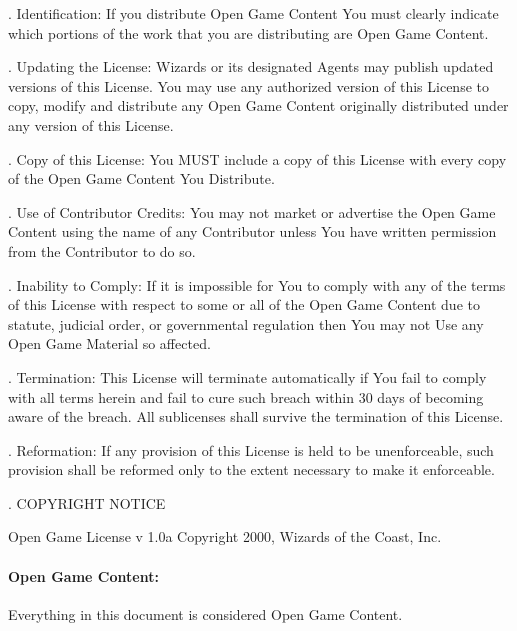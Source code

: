 \begin{multicols}{2}
\vspace{1em} . Identification: If you distribute Open Game Content You must clearly indicate which portions of the work that you are distributing are Open Game Content. 

\vspace{1em} . Updating the License: Wizards or its designated Agents may publish updated versions of this License. You may use any authorized version of this License to copy, modify and distribute any Open Game Content originally distributed under any version of this License. 

\vspace{1em} . Copy of this License: You MUST include a copy of this License with every copy of the Open Game Content You Distribute. 

\vspace{1em} . Use of Contributor Credits: You may not market or advertise the Open Game Content using the name of any Contributor unless You have written permission from the Contributor to do so. 

\vspace{1em} . Inability to Comply: If it is impossible for You to comply with any of the terms of this License with respect to some or all of the Open Game Content due to statute, judicial order, or governmental regulation then You may not Use any Open Game Material so affected. 

\vspace{1em} . Termination: This License will terminate automatically if You fail to comply with all terms herein and fail to cure such breach within 30 days of becoming aware of the breach. All sublicenses shall survive the termination of this License. 

\vspace{1em} . Reformation: If any provision of this License is held to be unenforceable, such provision shall be reformed only to the extent necessary to make it enforceable. 

\vspace{1em} . COPYRIGHT NOTICE 

Open Game License v 1.0a Copyright 2000, Wizards of the Coast, Inc. 

\paragraph{Open Game Content:} Everything in this document is considered Open Game Content.


\end{multicols}
